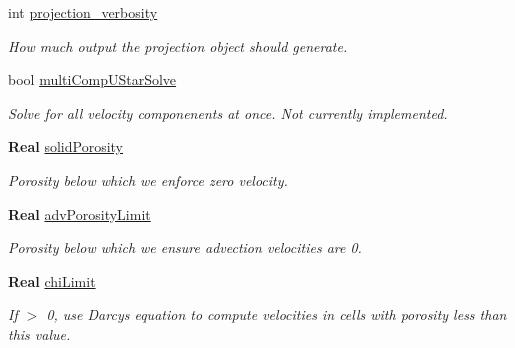 \begin{DoxyCompactItemize}
\mbox{\label{struct_mushy_layer_options_a97b3c19b1a7fc1118b568207d039aecc}} 
int \hyperlink{struct_mushy_layer_options_a97b3c19b1a7fc1118b568207d039aecc}{projection\+\_\+verbosity}
\begin{DoxyCompactList}\small\item\em How much output the projection object should generate. \end{DoxyCompactList}\item 
\mbox{\label{struct_mushy_layer_options_a074dfc6ec975c1656dd90ee7f579d4f4}} 
bool \hyperlink{struct_mushy_layer_options_a074dfc6ec975c1656dd90ee7f579d4f4}{multi\+Comp\+U\+Star\+Solve}
\begin{DoxyCompactList}\small\item\em Solve for all velocity componenents at once. Not currently implemented. \end{DoxyCompactList}\item 
\textbf{ Real} \hyperlink{struct_mushy_layer_options_a437d5973f3095fbaf98c98b017e393ed}{solid\+Porosity}
\begin{DoxyCompactList}\small\item\em Porosity below which we enforce zero velocity. \end{DoxyCompactList}\item 
\mbox{\label{struct_mushy_layer_options_ab1cf75b21ea55416604755a842f480b4}} 
\textbf{ Real} \hyperlink{struct_mushy_layer_options_ab1cf75b21ea55416604755a842f480b4}{adv\+Porosity\+Limit}
\begin{DoxyCompactList}\small\item\em Porosity below which we ensure advection velocities are 0. \end{DoxyCompactList}\item 
\mbox{\label{struct_mushy_layer_options_ac973e2e02877849b096e4b3a9017c7fd}} 
\textbf{ Real} \hyperlink{struct_mushy_layer_options_ac973e2e02877849b096e4b3a9017c7fd}{chi\+Limit}
\begin{DoxyCompactList}\small\item\em If $>$ 0, use Darcy\textquotesingle{}s equation to compute velocities in cells with porosity less than this value. \end{DoxyCompactList}\item 

\end{DoxyCompactItemize}

